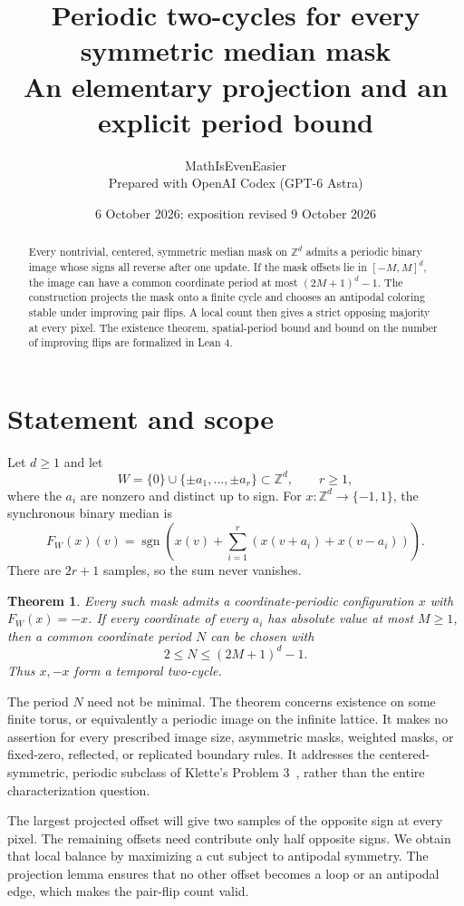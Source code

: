 \documentclass[11pt]{article}
\title{Periodic two-cycles for every symmetric median mask\\
\large An elementary projection and an explicit period bound}
\author{MathIsEvenEasier\\\small Prepared with OpenAI Codex (GPT-6 Astra)}
\date{6 October 2026; exposition revised 9 October 2026}
\newtheorem{theorem}{Theorem}
\newcommand{\Z}{\mathbb Z}
\newcommand{\sgn}{\operatorname{sgn}}
\begin{document}
\maketitle
\begin{abstract}
Every nontrivial, centered, symmetric median mask on $\mathbb Z^d$
admits a periodic binary image whose signs all reverse after one update.
If the mask offsets lie in $[-M,M]^d$, the image can have a common
coordinate period at most $(2M+1)^d-1$. The construction projects the
mask onto a finite cycle and chooses an antipodal coloring stable under
improving pair flips. A local count then gives a strict opposing majority
at every pixel. The existence theorem, spatial-period bound and bound on
the number of improving flips are formalized in Lean 4.
\end{abstract}

\section{Statement and scope}
Let $d\ge1$ and let
\[
 W=\{0\}\cup\{\pm a_1,\ldots,\pm a_r\}\subset\Z^d,
 \qquad r\ge1,
\]
where the $a_i$ are nonzero and distinct up to sign. For
$x:\Z^d\to\{-1,1\}$, the synchronous binary median is
\[
 F_W(x)(v)=\sgn\left(x(v)+\sum_{i=1}^r
                 (x(v+a_i)+x(v-a_i))\right).
\]
There are $2r+1$ samples, so the sum never vanishes.

\begin{theorem}\label{thm:main}
Every such mask admits a coordinate-periodic configuration $x$ with
$F_W(x)=-x$. If every coordinate of every $a_i$ has absolute value at most
$M\ge1$, then a common coordinate period $N$ can be chosen with
\[
             2\le N\le (2M+1)^d-1.
\]
Thus $x,-x$ form a temporal two-cycle.
\end{theorem}

The period $N$ need not be minimal. The theorem concerns existence on
some finite torus, or equivalently a periodic image on the infinite lattice.
It makes no assertion for every prescribed image size, asymmetric masks,
weighted masks, or fixed-zero, reflected, or replicated boundary rules.
It addresses the centered-symmetric, periodic subclass of Klette's
Problem 3~\cite{klette}, rather than the entire characterization question.

The largest projected offset will give two samples of the opposite
sign at every pixel. The remaining offsets need contribute only half
opposite signs. We obtain that local balance by maximizing a cut subject
to antipodal symmetry. The projection lemma ensures that no other offset
becomes a loop or an antipodal edge, which makes the pair-flip count valid.
\end{document}
